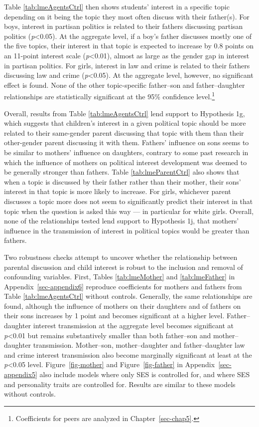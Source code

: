 \documentclass[
  letterpaper,
  DIV=11,
  numbers=noendperiod]{scrreprt}
\begin{document}
Table \ref{tab:lmeAgentsCtrl} then shows students' interest in a
specific topic depending on it being the topic they most often discuss
with their father(s). For boys, interest in partisan politics is related
to their fathers discussing partisan politics (\emph{p}\textless0.05).
At the aggregate level, if a boy's father discusses mostly one of the
five topics, their interest in that topic is expected to increase by 0.8
points on an 11-point interest scale (\emph{p}\textless0.01), almost as
large as the gender gap in interest in partisan politics. For girls,
interest in law and crime is related to their fathers discussing law and
crime (\emph{p}\textless0.05). At the aggregate level, however, no
significant effect is found. None of the other topic-specific
father--son and father--daughter relationships are statistically
significant at the 95\% confidence level.\footnote{Coefficients for
  peers are analyzed in Chapter~\ref{sec-chap5}.}

Overall, results from Table \ref{tab:lmeAgentsCtrl} lend support to
Hypothesis 1g, which suggests that children's interest in a given
political topic should be more related to their same-gender parent
discussing that topic with them than their other-gender parent
discussing it with them. Fathers' influence on sons seems to be similar
to mothers' influence on daughters, contrary to some past research in
which the influence of mothers on political interest development was
deemed to be generally stronger than fathers. Table
\ref{tab:lmeParentCtrl} also shows that when a topic is discussed by
their father rather than their mother, their sons' interest in that
topic is more likely to increase. For girls, whichever parent discusses
a topic more does not seem to significantly predict their interest in
that topic when the question is asked this way --- in particular for
white girls. Overall, none of the relationships tested lend support to
Hypothesis 1j, that mothers' influence in the transmission of interest
in political topics would be greater than fathers.

Two robustness checks attempt to uncover whether the relationship
between parental discussion and child interest is robust to the
inclusion and removal of confounding variables. First, Tables
\ref{tab:lmeMother} and \ref{tab:lmeFather} in
Appendix~\ref{sec-appendix6} reproduce coefficients for mothers and
fathers from Table \ref{tab:lmeAgentsCtrl} without controls. Generally,
the same relationships are found, although the influence of mothers on
their daughters and of fathers on their sons increases by 1 point and
becomes significant at a higher level. Father--daughter interest
transmission at the aggregate level becomes significant at
\emph{p}\textless0.01 but remains substantively smaller than both
father--son and mother--daughter transmission. Mother--son,
mother--daughter and father--daughter law and crime interest
transmission also become marginally significant at least at the
\emph{p}\textless0.05 level. Figure~\ref{fig-mother} and
Figure~\ref{fig-father} in Appendix~\ref{sec-appendix5} also include
models where only SES is controlled for, and where SES and personality
traits are controlled for. Results are similar to these models without
controls.
\end{document}
